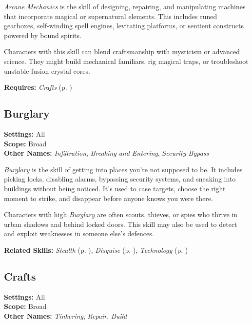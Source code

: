 \emph{Arcane Mechanics} is the skill of designing, repairing, and manipulating machines that incorporate magical or supernatural elements. This includes runed gearboxes, self-winding spell engines, levitating platforms, or sentient constructs powered by bound spirits.

Characters with this skill can blend craftsmanship with mysticism or advanced science. They might build mechanical familiars, rig magical traps, or troubleshoot unstable fusion-crystal cores.

\vspace{0.5\baselineskip}
\noindent\textbf{Requires:} \emph{Crafts} (p. \pageref{skill:crafts})



\subsection{Burglary}\label{skill:burglary}
\textbf{Settings:} All\\
\textbf{Scope:} Broad\\
\textbf{Other Names:} \emph{Infiltration}, \emph{Breaking and Entering}, \emph{Security Bypass}\\
\vspace{\baselineskip}

\emph{Burglary} is the skill of getting into places you're not supposed to be. It includes picking locks, disabling alarms, bypassing security systems, and sneaking into buildings without being noticed. It’s used to case targets, choose the right moment to strike, and disappear before anyone knows you were there.

Characters with high \emph{Burglary} are often scouts, thieves, or spies who thrive in urban shadows and behind locked doors. This skill may also be used to detect and exploit weaknesses in someone else's defences.

\vspace{0.5\baselineskip}
\noindent\textbf{Related Skills:} \emph{Stealth} (p. \pageref{skill:stealth}), \emph{Disguise} (p. \pageref{skill:disguise}), \emph{Technology} (p. \pageref{skill:technology})


\subsection{Crafts}\label{skill:crafts}
\textbf{Settings:} All\\
\textbf{Scope:} Broad\\
\textbf{Other Names:} \emph{Tinkering}, \emph{Repair}, \emph{Build}\\
\vspace{\baselineskip}

